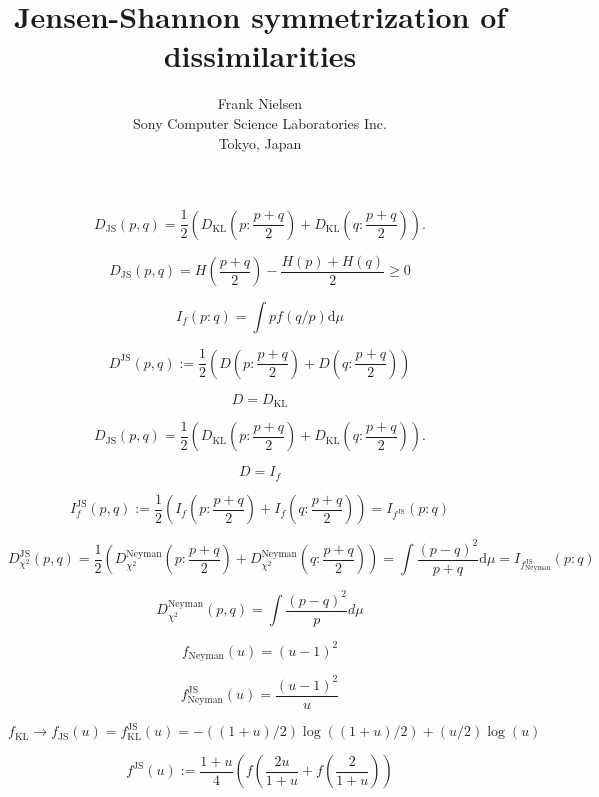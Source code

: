 \documentclass[11pt]{article}
\title{Jensen-Shannon symmetrization of dissimilarities}
\author{Frank Nielsen\\ Sony Computer Science Laboratories Inc.\\ Tokyo, Japan}
\def\dmu{\mathrm{d}\mu}
\def\KL{\mathrm{KL}}
\def\JS{\mathrm{JS}}
\begin{document}
\maketitle

$$
D_\JS(p,q)=\frac{1}{2}\left(D_\KL\left(p:\frac{p+q}{2}\right)+D_\KL\left(q:\frac{p+q}{2}\right)\right).
$$

$$
D_\JS(p,q) = H\left(\frac{p+q}{2}\right)-\frac{H(p)+H(q)}{2}\geq 0
$$

$$
I_f(p:q)=\int pf(q/p)\dmu
$$

$$
D^\JS(p,q):=\frac{1}{2}\left(D\left(p:\frac{p+q}{2}\right)+D\left(q:\frac{p+q}{2}\right)\right)
$$

$$
D=D_\KL
$$

$$
D_\JS(p,q)=\frac{1}{2}\left(D_\KL\left(p:\frac{p+q}{2}\right)+D_\KL\left(q:\frac{p+q}{2}\right)\right).
$$

$$
D=I_f
$$


$$
I_f^\JS(p,q):=\frac{1}{2}\left(I_f\left(p:\frac{p+q}{2}\right)+I_f\left(q:\frac{p+q}{2}\right)\right)=I_{f^\JS}(p:q)
$$


$$
D_{\chi^2}^\JS(p,q)=\frac{1}{2}\left(D_{\chi^2}^{\mathrm{Neyman}}\left(p:\frac{p+q}{2}\right)+D_{\chi^2}^{\mathrm{Neyman}}\left(q:\frac{p+q}{2}\right)\right) = \int \frac{(p-q)^2}{p+q}\dmu =I_{f_{\mathrm{Neyman}}^\JS}(p:q)
$$


$$
D_{\chi^2}^{\mathrm{Neyman}}(p,q)=\int \frac{(p-q)^2}{p} d\mu
$$

$$
f_{\mathrm{Neyman}}(u)=(u-1)^2
$$

$$
f_{\mathrm{Neyman}}^\JS(u)=\frac{(u-1)^2}{u}
$$
 
$$
f_\KL\rightarrow f_\JS(u)=f_\KL^\JS(u)=-((1+u)/2)\log((1+u)/2)+(u/2)\log(u)
$$

$$
f^\JS(u):=\frac{1+u}{4}\left( f\left(\frac{2u}{1+u} + f\left(\frac{2}{1+u}\right)\right)
$$
 
\end{document}
